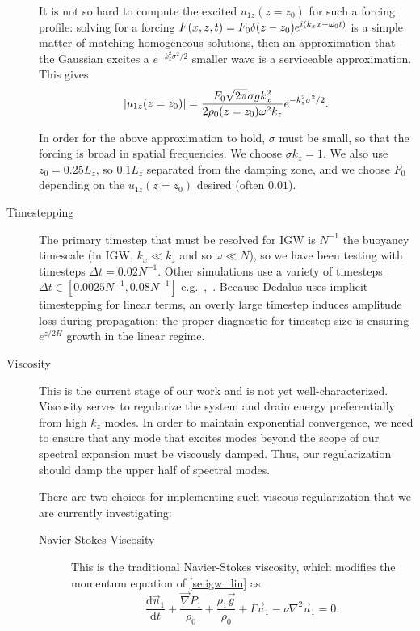\documentclass[11pt,
        usenames, %
        dvipsnames %
    ]{article}
\newcommand*{\rd}[2]{\frac{\mathrm{d}#1}{\mathrm{d}#2}}
\DeclarePairedDelimiter\abs{\lvert}{\rvert}
\DeclarePairedDelimiter\p{\lparen}{\rparen}
\begin{document}
\begin{description}
        It is not so hard to compute the excited $u_{1z}(z = z_0)$ for such a
        forcing profile: solving for a forcing $F(x, z, t) = F_0\delta\p*{z -
        z_0}e^{i(k_xx - \omega_0t)}$ is a simple matter of matching homogeneous
        solutions, then an approximation that the Gaussian excites
        a $e^{-k_z^2\sigma^2/2}$ smaller wave is a serviceable approximation.
        This gives
        \begin{equation}
            \abs*{u_{1z}(z = z_0)} = \frac{F_0\sqrt{2\pi}\sigma gk_x^2}{
                2\rho_0\p*{z = z_0}\omega^2 k_z}e^{-k_z^2\sigma^2/2}.
        \end{equation}

        In order for the above approximation to hold, $\sigma$ must be small, so
        that the forcing is broad in spatial frequencies. We choose $\sigma k_z
        = 1$. We also use $z_0 = 0.25L_z$, so $0.1L_z$ separated from the
        damping zone, and we choose $F_0$ depending on the $u_{1z}(z = z_0)$
        desired (often $0.01$).

    \item[Timestepping] The primary timestep that must be resolved for IGW is
        $N^{-1}$ the buoyancy timescale (in IGW, $k_x \ll k_z$ and so $\omega
        \ll N$), so we have been testing with timesteps $\Delta t = 0.02N^{-1}$.
        Other simulations use a variety of timesteps $\Delta t \in
        [0.0025N^{-1}, 0.08N^{-1}]$
        e.g.~\cite{LecoanetDamp},~\cite{Sutherland1}. Because Dedalus uses
        implicit timestepping for linear terms, an overly large timestep induces
        amplitude loss during propagation; the proper diagnostic for timestep
        size is ensuring $e^{z/2H}$ growth in the linear regime.

    \item[Viscosity] This is the current stage of our work and is not yet
        well-characterized. Viscosity serves to regularize the system and
        drain energy preferentially from high $k_z$ modes. In order to maintain
        exponential convergence, we need to ensure that any mode that excites
        modes beyond the scope of our spectral expansion must be viscously
        damped. Thus, our regularization should damp the upper half of spectral
        modes.

        There are two choices for implementing such viscous regularization that
        we are currently investigating:

        \begin{description}
            \item[Navier-Stokes Viscosity] This is the traditional Navier-Stokes
                viscosity, which modifies the momentum equation of
                \autoref{se:igw_lin} as
                \begin{equation}
                    \rd{\vec{u}_1}{t} + \frac{\vec{\nabla}P_1}{\rho_0}
                        + \frac{\rho_1\vec{g}}{\rho_0} + \Gamma \vec{u}_1
                        - \nu \nabla^2 \vec{u}_1 = 0.
                \end{equation}


\end{description}
\end{description}
\end{document}
